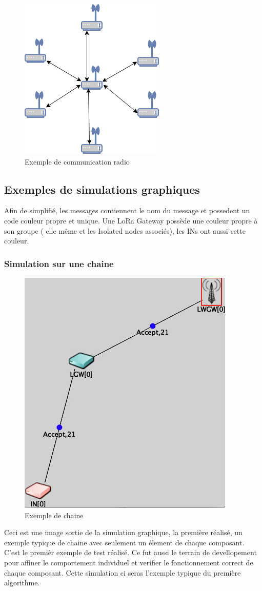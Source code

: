 \documentclass[11pt]{article}
\begin{document}
\begin{figure}[!ht]
\centering
\includegraphics[scale=1]{ex_radio.png} 
\caption{Exemple de communication radio}
\end{figure}


\newpage
\subsection{Exemples de simulations graphiques}
Afin de simplifié, les messages contiennent le nom du message et possedent un code couleur propre et unique. Une LoRa Gateway possède une couleur propre à son groupe ( elle même et les Isolated nodes associés), les INs ont aussi cette couleur.
\subsubsection{Simulation sur une chaine}
\begin{figure}[!ht]
\centering
\includegraphics[scale=0.6]{chaine.png} 
\caption{Exemple de chaine}
\end{figure}
Ceci est une image sortie de la simulation graphique, la première réalisé, un exemple typique de chaine avec seulement un élement de chaque composant. C'est le premièr exemple de test réalisé. Ce fut aussi le terrain de devellopement pour affiner le comportement individuel et verifier le fonctionnement correct de chaque composant. Cette simulation ci seras l'exemple typique du première algorithme.
\newpage
\end{document}
